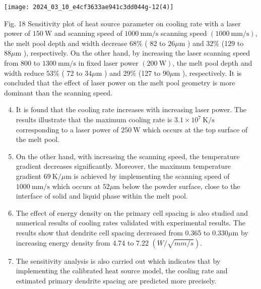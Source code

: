 \documentclass[10pt]{article}
\begin{document}
\begin{center}
\texttt{[image: 2024\_03\_10\_e4cf3633ae941c3dd044g-12(4)]}
\end{center}

Fig. 18 Sensitivity plot of heat source parameter on cooling rate with a laser power of $150 \mathrm{~W}$ and scanning speed of $1000 \mathrm{~mm} / \mathrm{s}$ scanning speed $(1000 \mathrm{~mm} / \mathrm{s})$, the melt pool depth and width decrease $68 \%$ ( 82 to $26 \mu \mathrm{m}$ ) and $32 \%$ (129 to $88 \mu \mathrm{m}$ ), respectively. On the other hand, by increasing the laser scanning speed from 800 to $1300 \mathrm{~mm} / \mathrm{s}$ in fixed laser power $(200 \mathrm{~W})$, the melt pool depth and width reduce $53 \%$ ( 72 to $34 \mu \mathrm{m}$ ) and 29\% (127 to $90 \mu \mathrm{m}$ ), respectively. It is concluded that the effect of laser power on the melt pool geometry is more dominant than the scanning speed.

\begin{enumerate}
  \setcounter{enumi}{3}
  \item It is found that the cooling rate increases with increasing laser power. The results illustrate that the maximum cooling rate is $3.1 \times 10^{7} \mathrm{~K} / \mathrm{s}$ corresponding to a laser power of $250 \mathrm{~W}$ which occurs at the top surface of the melt pool.

  \item On the other hand, with increasing the scanning speed, the temperature gradient decreases significantly. Moreover, the maximum temperature gradient $69 \mathrm{~K} / \mu \mathrm{m}$ is achieved by implementing the scanning speed of $1000 \mathrm{~mm} / \mathrm{s}$ which occurs at $52 \mu \mathrm{m}$ below the powder surface, close to the interface of solid and liquid phase within the melt pool.

  \item The effect of energy density on the primary cell spacing is also studied and numerical results of cooling rates validated with experimental results. The results show that dendrite cell spacing decreased from 0.365 to $0.330 \mu \mathrm{m}$ by increasing energy density from 4.74 to 7.22 $(W / \sqrt{m m / s})$.

  \item The sensitivity analysis is also carried out which indicates that by implementing the calibrated heat source model, the cooling rate and estimated primary dendrite spacing are predicted more precisely.

\end{enumerate}
\end{document}

